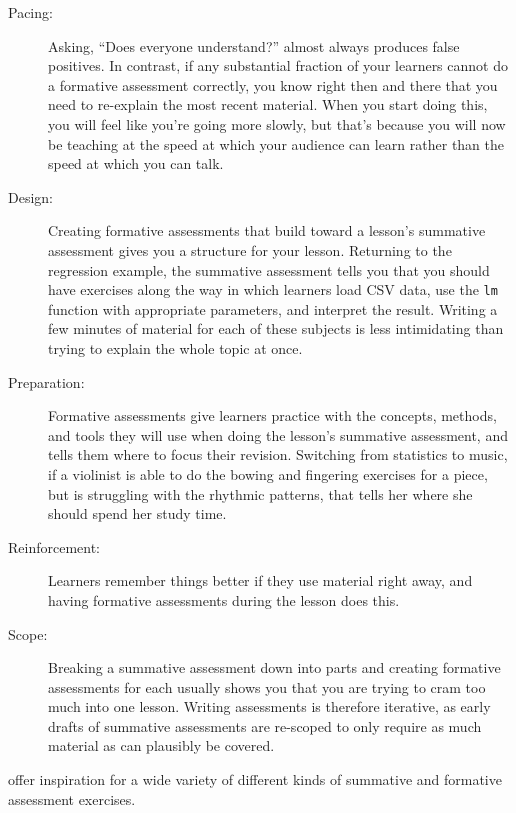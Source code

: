\documentclass[10pt,letterpaper]{article}
\begin{document}
\begin{description}

\item[Pacing:] Asking, ``Does everyone understand?''  almost always produces
  false positives.  In contrast, if any substantial fraction of your learners
  cannot do a formative assessment correctly, you know right then and there that
  you need to re-explain the most recent material.  When you start doing this,
  you will feel like you're going more slowly, but that's because you will now
  be teaching at the speed at which your audience can learn rather than the
  speed at which you can talk.

\item[Design:] Creating formative assessments that build toward a lesson's
  summative assessment gives you a structure for your lesson.  Returning to the
  regression example, the summative assessment tells you that you should have
  exercises along the way in which learners load CSV data, use the \texttt{lm}
  function with appropriate parameters, and interpret the result.  Writing a few
  minutes of material for each of these subjects is less intimidating than
  trying to explain the whole topic at once.
  
\item[Preparation:] Formative assessments give learners practice with the
  concepts, methods, and tools they will use when doing the lesson's summative
  assessment, and tells them where to focus their revision.  Switching from
  statistics to music, if a violinist is able to do the bowing and fingering
  exercises for a piece, but is struggling with the rhythmic patterns, that
  tells her where she should spend her study time.
  
\item[Reinforcement:] Learners remember things better if they use material right
  away, and having formative assessments during the lesson does this.

\item[Scope:] Breaking a summative assessment down into parts and creating
  formative assessments for each usually shows you that you are trying to cram
  too much into one lesson.  Writing assessments is therefore iterative, as
  early drafts of summative assessments are re-scoped to only require as much
  material as can plausibly be covered.

\end{description}

\cite{Broo2016,Majo2015,Rice2018} offer inspiration for a wide variety of
different kinds of summative and formative assessment exercises.
\end{document}
